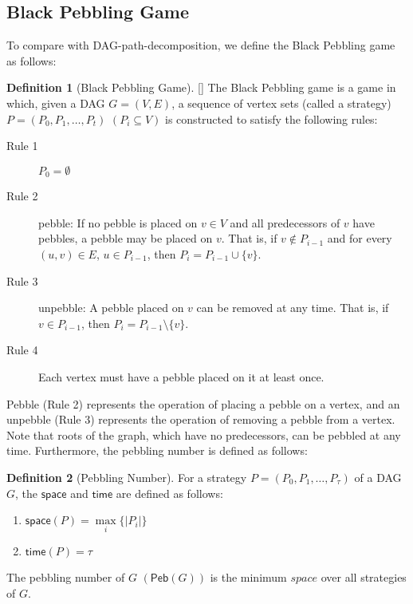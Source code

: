 \documentclass[runningheads]{llncs}
\theoremstyle{plain}
\theoremstyle{definition}
\newtheorem{definition}{Definition}
\begin{document}
\subsection{Black Pebbling Game} %
To compare with DAG-path-decomposition, we define the Black Pebbling game as follows:

\begin{definition}[Black Pebbling Game][\cite{art13}]
    The Black Pebbling game is a game in which, given a DAG $G = (V, E)$, a sequence of vertex sets (called a strategy) $P = (P_0, P_1, \dots, P_t)$ $(P_i \subseteq V)$ is constructed to satisfy the following rules:

    \begin{description}
        \item[Rule 1] $P_0 = \emptyset$
        \item[Rule 2] pebble: If no pebble is placed on $v \in V$ and all predecessors of $v$ have pebbles, a pebble may be placed on $v$. That is, if $v \notin P_{i-1}$ and for every $(u, v) \in E$, $u \in P_{i-1}$, then $P_i = P_{i-1} \cup \{v\}$.
        \item[Rule 3] unpebble: A pebble placed on $v$ can be removed at any time. That is, if $v \in P_{i-1}$, then $P_i = P_{i-1} \setminus \{v\}$.
        \item[Rule 4] Each vertex must have a pebble placed on it at least once.
    \end{description}
\end{definition}

Pebble (Rule 2) represents the operation of placing a pebble on a vertex, and an unpebble (Rule 3) represents the operation of removing a pebble from a vertex. Note that roots of the graph, which have no predecessors, can be pebbled at any time. Furthermore, the pebbling number is defined as follows:

\begin{definition}[Pebbling Number]
    For a strategy $P = (P_0, P_1, \dots, P_{\tau})$ of a DAG $G$, the $\mathsf{space}$ and $\mathsf{time}$ are defined as follows:

    \begin{enumerate}
        \item $\mathsf{space}(P) = \underset{i}{\max} \{ |P_i| \}$
        \item $\mathsf{time}(P) = \tau$
    \end{enumerate}

    The pebbling number of $G$ $(\mathsf{Peb}(G))$ is the minimum $space$ over all strategies of $G$.
\end{definition}
\end{document}
